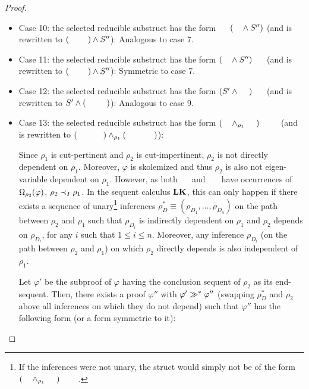 \documentclass{llncs}
\begin{document}
\begin{proof}
\begin{itemize}
	\item Case 10: the selected reducible substruct has the form $\hF{S} \hF{\structtimes} (\hF{S'} \structplus S'')$ (and is rewritten to $(\hF{S} \hF{\structtimes} \hF{S'}) \structplus S''$): Analogous to case 7.

	\item Case 11: the selected reducible substruct has the form $(\hF{S'} \structplus S'') \hF{\structtimes} \hF{S}$ (and is rewritten to $(\hF{S'} \hF{\structtimes} \hF{S} ) \structplus S''$): Symmetric to case 7.

	\item Case 12: the selected reducible substruct has the form $(S' \structplus \hF{S''}) \hF{\structtimes} \hF{S}$ (and is rewritten to $S' \structplus (\hF{S''} \hF{\structtimes} \hF{S} )$): Analogous to case 9.

	\item Case 13: the selected reducible substruct has the form $(\hF{S'} \structplus_{\rho_1} \hF{S''}) \hF{\structtimes_{\rho_2}} \hF{S}$ (and is rewritten to $(\hF{S'} \hF{\structtimes_{\rho_2}} \hF{S}) \structplus_{\rho_1} (\hF{S''} \hF{\structtimes_{\rho_2}} \hF{S})$):


Since $\rho_1$ is cut-pertinent and $\rho_2$ is cut-impertinent, $\rho_2$ is not directly dependent on $\rho_1$. Moreover, $\varphi$ is skolemized and thus $\rho_2$ is also not eigen-variable dependent on $\rho_1$. However, as both $\hF{S'}$ and $\hF{S''}$ have occurrences of $\Omega_{\rho_2}(\varphi)$,  $\rho_2 \prec_I \rho_1$. In the sequent calculus $\mathbf{LK}$, this can only happen if there exists a sequence of unary\footnote{If the inferences were not unary, the struct would simply not be of the form $(\hF{S'} \structplus_{\rho_1} \hF{S''}) \hF{\structtimes_{\rho_2}} \hF{S}$.} inferences $\rho^*_D \equiv (\rho_{D_1},\ldots,\rho_{D_n})$ on the path between $\rho_2$ and $\rho_1$ such that $\rho_{D_i}$ is indirectly dependent on $\rho_1$ and $\rho_2$ depends on $\rho_{D_i}$, for any $i$ such that $1 \leq i \leq n$. Moreover, any inference $\rho_{D_i}$ (on the path between $\rho_2$ and $\rho_1$) on which $\rho_2$ directly depends is also independent of $\rho_1$.

Let $\varphi'$ be the subproof of $\varphi$ having the conclusion sequent of $\rho_2$ as its end-sequent. Then, there exists a proof $\varphi''$ with $\varphi' \gg^* \varphi''$ (swapping $\rho^*_D$ and $\rho_2$ above all inferences on which they do not depend) such that $\varphi''$ has the following form (or a form symmetric to it):


\end{itemize}
\end{proof}
\end{document}

